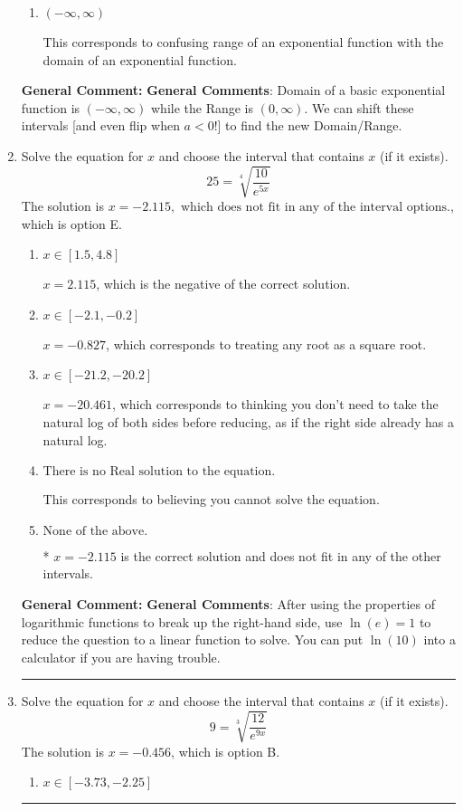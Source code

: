 \documentclass{extbook}[14pt]
\newcommand{\litem}[1]{\item #1

\rule{\textwidth}{0.4pt}}
\begin{document}
\begin{enumerate}
{\begin{enumerate}[label=\Alph*.]
$[-2, \infty)$, which corresponds to including the endpoint.
\item \( (-\infty, \infty) \)

This corresponds to confusing range of an exponential function with the domain of an exponential function.
\end{enumerate}

\textbf{General Comment:} \textbf{General Comments}: Domain of a basic exponential function is $(-\infty, \infty)$ while the Range is $(0, \infty)$. We can shift these intervals [and even flip when $a<0$!] to find the new Domain/Range.
}
\litem{
 Solve the equation for $x$ and choose the interval that contains $x$ (if it exists).
\[  25 = \sqrt[4]{\frac{10}{e^{5x}}} \]The solution is \( x = -2.115, \text{ which does not fit in any of the interval options.} \), which is option E.\begin{enumerate}[label=\Alph*.]
\item \( x \in [1.5, 4.8] \)

$x = 2.115$, which is the negative of the correct solution.
\item \( x \in [-2.1, -0.2] \)

$x = -0.827$, which corresponds to treating any root as a square root.
\item \( x \in [-21.2, -20.2] \)

$x = -20.461$, which corresponds to thinking you don't need to take the natural log of both sides before reducing, as if the right side already has a natural log.
\item \( \text{There is no Real solution to the equation.} \)

This corresponds to believing you cannot solve the equation.
\item \( \text{None of the above.} \)

* $x = -2.115$ is the correct solution and does not fit in any of the other intervals.
\end{enumerate}

\textbf{General Comment:} \textbf{General Comments}: After using the properties of logarithmic functions to break up the right-hand side, use $\ln(e) = 1$ to reduce the question to a linear function to solve. You can put $\ln(10)$ into a calculator if you are having trouble.
}
\litem{
 Solve the equation for $x$ and choose the interval that contains $x$ (if it exists).
\[  9 = \sqrt[3]{\frac{12}{e^{9x}}} \]The solution is \( x = -0.456 \), which is option B.\begin{enumerate}[label=\Alph*.]
\item \( x \in [-3.73, -2.25] \)


\end{enumerate}}
\end{enumerate}
\end{document}
